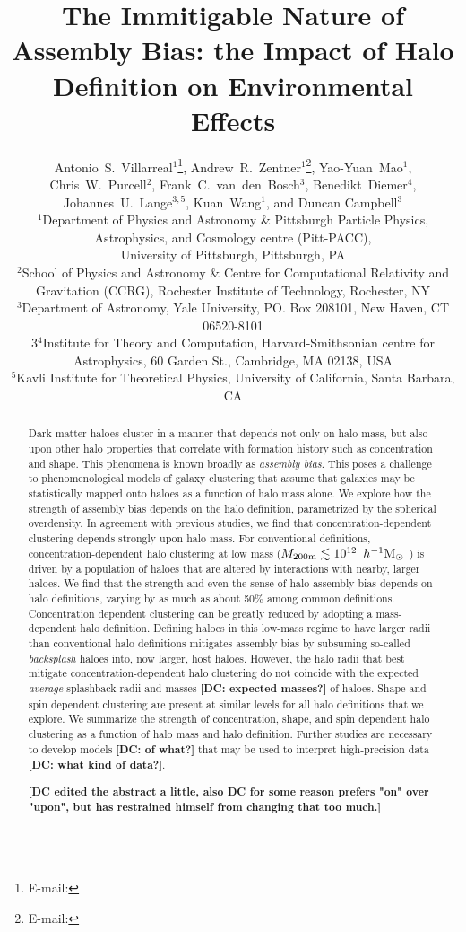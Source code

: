 \documentclass[usenatbib,fleqn]{mnras}
\title[The Immitigable Nature of Assembly Bias]{The Immitigable Nature of Assembly
Bias: the Impact of Halo Definition on Environmental Effects}
\author[A.~S.~Villarreal et al.]{%
Antonio~S.~Villarreal$^{1}$\thanks{E-mail: \email{asv13@pitt.edu}},
Andrew~R.~Zentner$^{1}$\thanks{E-mail: \email{zentner@pitt.edu}},
Yao-Yuan~Mao$^{1}$, %
Chris~W.~Purcell$^{2}$,%
\newauthor
Frank~C.~van~den~Bosch$^{3}$, %
Benedikt~Diemer$^{4}$, %
Johannes~U.~Lange$^{3,5}$,
Kuan~Wang$^{1}$, 
\newauthor
and Duncan Campbell$^{3}$
\vspace*{8pt}
\\
$^{1}$Department of Physics and Astronomy \& Pittsburgh Particle Physics, Astrophysics, and Cosmology centre (Pitt-PACC), \\
\phantom{$^{1}$}University of Pittsburgh, Pittsburgh, PA\\
$^{2}$School of Physics and Astronomy \& Centre for Computational Relativity and Gravitation (CCRG), Rochester Institute of Technology, Rochester, NY \\
$^{3}$Department of Astronomy, Yale University, PO. Box 208101, New Haven, CT 06520-8101\\
3$^{4}$Institute for Theory and Computation, Harvard-Smithsonian centre for Astrophysics, 60 Garden St., Cambridge, MA 02138, USA \\
$^{5}$Kavli Institute for Theoretical Physics, University of California, Santa Barbara, CA}
\begin{document}
\label{firstpage}
\pagerange{\pageref{firstpage}--\pageref{lastpage}} 

\maketitle

\begin{abstract}

Dark matter haloes cluster in a manner that depends not only on halo mass, but also upon other halo properties that correlate with formation history such as concentration and shape. This phenomena is known broadly as {\em assembly bias}. This poses a challenge to phenomenological models of galaxy clustering that assume that galaxies may be statistically mapped onto haloes as a function of halo mass alone. We explore how the strength of assembly bias depends on the halo definition, parametrized by the spherical overdensity. In agreement with previous studies, we find that concentration-dependent clustering depends strongly upon halo mass. For conventional definitions, concentration-dependent halo clustering at low mass ($M_{200\text{m}} \lesssim 10^{12}\, \ h^{-1}\mathrm{M}_{\odot}~$) is driven by a population of haloes that are altered by interactions with nearby, larger haloes. We find that the strength and even the sense of halo assembly bias depends on halo definitions, varying by as much as about 50\% among common definitions. Concentration dependent clustering can be greatly reduced by adopting a mass-dependent halo definition. Defining haloes in this low-mass regime to have larger radii than conventional halo definitions mitigates assembly bias by subsuming so-called {\em backsplash} haloes into, now larger, host haloes. However, the halo radii that best mitigate concentration-dependent halo clustering do not coincide with the expected {\em average} splashback radii and masses {\bf [DC: expected masses?]} of haloes. Shape and spin dependent clustering are present at similar levels for all halo definitions that we explore. We summarize the strength of concentration, shape, and spin dependent halo clustering as a function of halo mass and halo definition. Further studies are necessary to develop models {\bf [DC: of what?]} that may be used to interpret high-precision data {\bf [DC: what kind of data?]}.

{\bf [DC edited the abstract a little, also DC for some reason prefers "on" over "upon", but has restrained himself from changing that too much.]}
\end{abstract}
\end{document}
